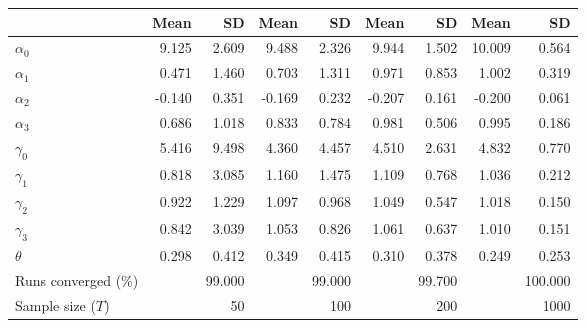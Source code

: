 
\begin{tabular}[t]{lrrrrrrrr}
\toprule
  & Mean & SD & Mean  & SD  & Mean   & SD   & Mean    & SD   \\
\midrule
$\alpha_{0}$ & 9.125 & 2.609 & 9.488 & 2.326 & 9.944 & 1.502 & 10.009 & 0.564\\
$\alpha_{1}$ & 0.471 & 1.460 & 0.703 & 1.311 & 0.971 & 0.853 & 1.002 & 0.319\\
$\alpha_{2}$ & -0.140 & 0.351 & -0.169 & 0.232 & -0.207 & 0.161 & -0.200 & 0.061\\
$\alpha_{3}$ & 0.686 & 1.018 & 0.833 & 0.784 & 0.981 & 0.506 & 0.995 & 0.186\\
$\gamma_{0}$ & 5.416 & 9.498 & 4.360 & 4.457 & 4.510 & 2.631 & 4.832 & 0.770\\
$\gamma_{1}$ & 0.818 & 3.085 & 1.160 & 1.475 & 1.109 & 0.768 & 1.036 & 0.212\\
$\gamma_{2}$ & 0.922 & 1.229 & 1.097 & 0.968 & 1.049 & 0.547 & 1.018 & 0.150\\
$\gamma_{3}$ & 0.842 & 3.039 & 1.053 & 0.826 & 1.061 & 0.637 & 1.010 & 0.151\\
$\theta$ & 0.298 & 0.412 & 0.349 & 0.415 & 0.310 & 0.378 & 0.249 & 0.253\\
Runs converged (\%) &  & 99.000 &  & 99.000 &  & 99.700 &  & 100.000\\
Sample size ($T$) &  & 50 &  & 100 &  & 200 &  & 1000\\
\bottomrule
\end{tabular}
